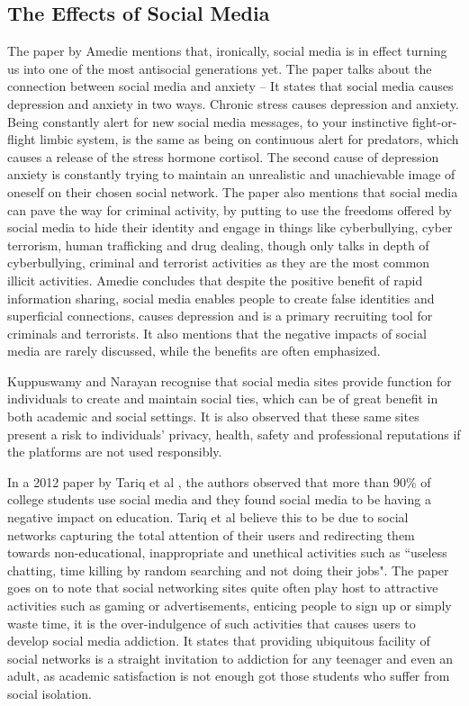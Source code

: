 \documentclass[lettersize,journal]{IEEEtran}
\begin{document}
\subsection{The Effects of Social Media}
    The paper by Amedie \cite{Amedie 2015} mentions that, ironically, social
    media is in effect turning us into one of the most antisocial generations
    yet. The paper talks about the connection between social media and anxiety
    – It states that social media causes depression and anxiety in two ways. Chronic
    stress causes depression and anxiety. Being constantly alert for new social
    media messages, to your instinctive fight-or-flight limbic system, is the
same as being on continuous alert for predators, which causes a release of
    the stress hormone cortisol. The second cause of depression anxiety is
    constantly trying to maintain an unrealistic and unachievable image of
    oneself on their chosen social network. The paper also mentions
    that social media can pave the way for criminal activity, by putting to use
    the freedoms offered by social media to hide their identity and engage in
    things like cyberbullying, cyber terrorism, human trafficking and drug dealing,
    though only talks in depth of cyberbullying, criminal and terrorist activities
    as they are the most common illicit activities. Amedie concludes that despite
    the positive benefit of rapid information sharing, social media enables people
    to create false identities and superficial connections, causes depression and
    is a primary recruiting tool for criminals and terrorists. It also mentions
    that the negative impacts of social media are rarely discussed, while the benefits
    are often emphasized.

    Kuppuswamy and Narayan \cite{Kuppuswamy et al 2010} recognise that social
    media sites provide function for individuals to create and maintain social
    ties, which can be of great benefit in both academic and social settings.
    It is also observed that these same sites present a risk to individuals'
    privacy, health, safety and professional reputations if the platforms are
    not used responsibly.

    In a 2012 paper by Tariq et al \cite{Tariq et al 2012}, the authors observed that more than 90\%
    of college students use social media \cite{Ellison et al 2007} and they found social media to be
    having a negative impact on education. Tariq et al believe this to be due to social networks
    capturing the total attention of their users and redirecting them towards non-educational, inappropriate
    and unethical activities such as ``useless chatting, time killing by random searching and not doing their jobs". The paper
    goes on to note that social networking sites quite often play host to attractive activities such
    as gaming or advertisements, enticing people to sign up or simply waste time, it is the over-indulgence
    of such activities that causes users to develop social media addiction. It states that providing ubiquitous
    facility of social networks is a straight invitation to addiction for any teenager and even an adult, as
    academic satisfaction is not enough got those students who suffer from social isolation\cite{Pempek et al 2009}. 
\end{document}
